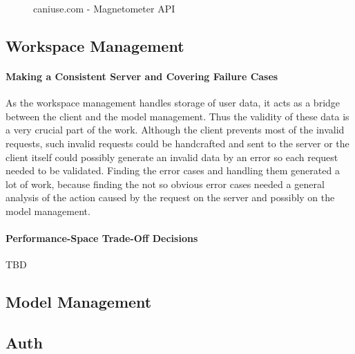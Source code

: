 \begin{figure}[ht]
    \centering
    \caption{caniuse.com - Magnetometer API}
\end{figure}

\subsection{Workspace Management}
\paragraph{Making a Consistent Server and Covering Failure Cases}
As the workspace management handles storage of user data, it acts as a bridge between the client and the model management. Thus the validity of these data is a very crucial part of the work. Although the client prevents most of the invalid requests, such invalid requests could be handcrafted and sent to the server or the client itself could possibly generate an invalid data by an error so each request needed to be validated. Finding the error cases and handling them generated a lot of work, because finding the not so obvious error cases needed a general analysis of the action caused by the request on the server and possibly on the model management.
\paragraph{Performance-Space Trade-Off Decisions}
TBD
\subsection{Model Management}
\subsection{Auth}
